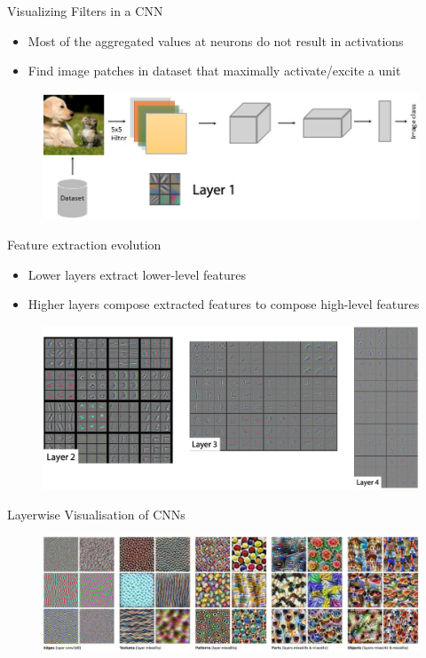 \documentclass[11pt,compress,t,notes=noshow, aspectratio=169, xcolor=table]{beamer}
\begin{document}
\begin{frame}{Visualizing Filters in a CNN}
    \begin{itemize}
        \item Most of the aggregated values at neurons do not result in activations
        \item Find image patches in dataset that maximally activate/excite a unit
    \end{itemize}
    \begin{figure}
        \centering
        \includegraphics[scale=.6]{Bild6}
    \end{figure}
\end{frame}

	
\begin{frame}{Feature extraction evolution}
    \begin{itemize}
        \item Lower layers extract lower-level features
        \item Higher layers compose extracted features to compose high-level features
    \end{itemize}
    \begin{figure}[h]
         \includegraphics[scale=.4]{bild7}
    \end{figure}
\end{frame}
	
	
\begin{frame}{Layerwise Visualisation of CNNs}
    \begin{figure}
        \centering
        \includegraphics[scale=.38]{bild8}
    \end{figure}
\end{frame}
	
\end{document}
